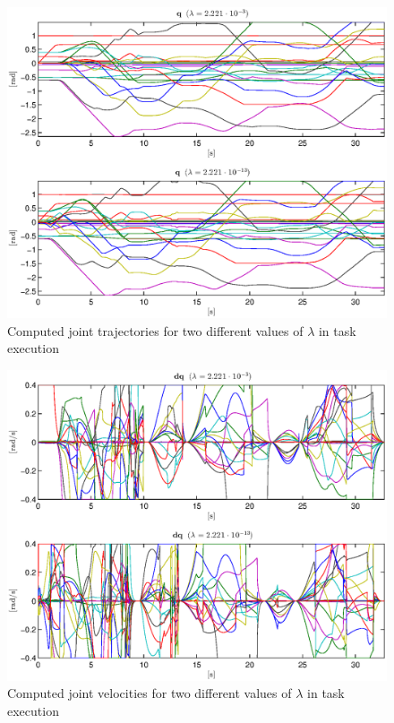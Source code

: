 \begin{figure}
    \centering
        \includegraphics{gfx/q.eps} \caption{Computed joint trajectories for two different values of $\lambda$ in task execution}
        \label{joint_trj}
\end{figure}
\newpage
\begin{figure}
    \centering
        \includegraphics{gfx/dq.eps}
    \caption{Computed joint velocities for two different values of $\lambda$ in task execution}\label{joint_vel}
\end{figure}
\clearpage

